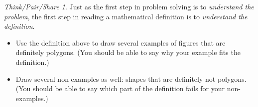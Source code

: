 \documentclass[12pt, reqno]{amsart}
\theoremstyle{remark}
\newtheorem*{thinkpair*}{Think/Pair/Share}
\theoremstyle{definition}
\numberwithin{equation}{section}  %
\begin{document}
\bigskip

\begin{thinkpair*}
Just as the first step in problem solving is to \emph{understand the problem}, the first step in reading a mathematical definition is to \emph{understand the definition}.   
\begin{itemize}
\item
Use the definition above to draw several examples of figures that are definitely polygons.  (You should be able to say why your example fits the definition.)\\
\item
Draw several non-examples as well: shapes that are definitely not polygons.  (You should be able to say which part of the definition fails for your non-examples.)\\

\end{itemize}
\end{thinkpair*}



\newpage
\end{document}
